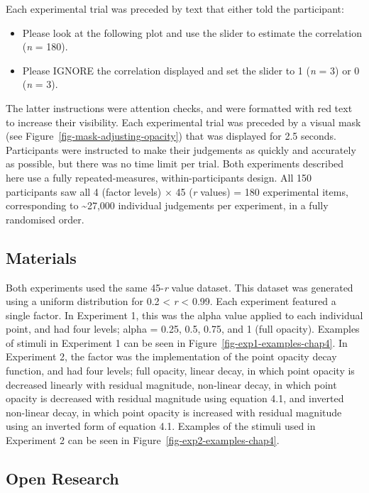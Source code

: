 \documentclass[../main.tex]{subfiles}
\begin{document}
Each experimental trial was preceded by text that either told the
participant:

\begin{itemize}
\tightlist
\item
  Please look at the following plot and use the slider to estimate the
  correlation (\emph{n} = 180).
\item
  Please IGNORE the correlation displayed and set the slider to 1
  (\emph{n} = 3) or 0 (\emph{n} = 3).
\end{itemize}

The latter instructions were attention checks, and were formatted with
red text to increase their visibility. Each experimental trial was
preceded by a visual mask (see Figure~\ref{fig-mask-adjusting-opacity})
that was displayed for 2.5 seconds. Participants were instructed to make
their judgements as quickly and accurately as possible, but there was no
time limit per trial. Both experiments described here use a fully
repeated-measures, within-participants design. All 150 participants saw
all 4 (factor levels) \(\times\) 45 (\emph{r} values) = 180 experimental
items, corresponding to \sim 27,000 individual judgements per
experiment, in a fully randomised order.

\subsection{Materials}\label{shared-materials-chap4}

Both experiments used the same 45-\emph{r} value dataset. This dataset
was generated using a uniform distribution for 0.2 \textless{} \emph{r}
\textless{} 0.99. Each experiment featured a single factor. In
Experiment 1, this was the alpha value applied to each individual point,
and had four levels; alpha = 0.25, 0.5, 0.75, and 1 (full opacity).
Examples of stimuli in Experiment 1 can be seen in
Figure~\ref{fig-exp1-examples-chap4}. In Experiment 2, the factor was
the implementation of the point opacity decay function, and had four
levels; full opacity, linear decay, in which point opacity is decreased
linearly with residual magnitude, non-linear decay, in which point
opacity is decreased with residual magnitude using equation 4.1, and
inverted non-linear decay, in which point opacity is increased with
residual magnitude using an inverted form of equation 4.1. Examples of
the stimuli used in Experiment 2 can be seen in
Figure~\ref{fig-exp2-examples-chap4}.

\subsection{Open Research}\label{open-research-chap4}
\end{document}
